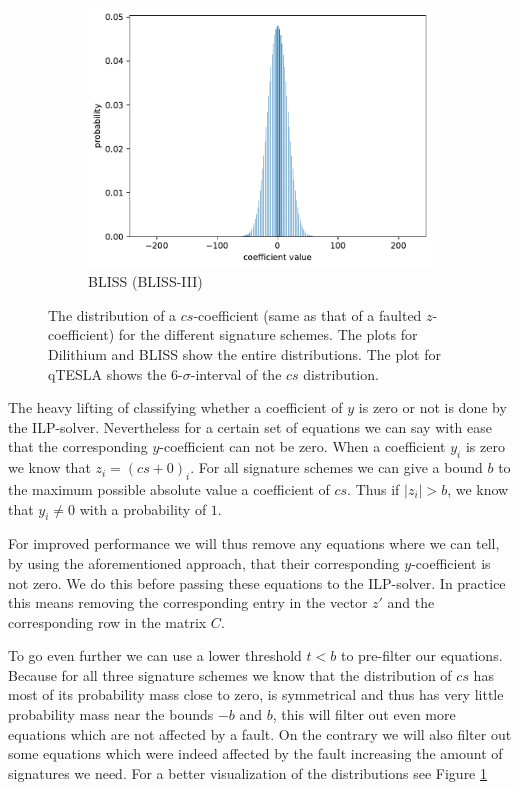 \begin{figure}
\begin{subfigure}{.5\textwidth}
		\includegraphics[width=.95\linewidth]{plots/bliss_l3_cs_plot}%
		\caption{BLISS (BLISS-III)}%
	\end{subfigure}%
%
	\caption{The distribution of a $cs$-coefficient (same as that of a faulted $z$-coefficient) for the different signature schemes. The plots for Dilithium and BLISS show the entire distributions. The plot for qTESLA shows the $6$-$σ$-interval of the $cs$ distribution.}
	\label{fig:csdist}
\end{figure}


The heavy lifting of classifying whether a coefficient of $y$ is zero or not is done by the ILP-solver.
Nevertheless for a certain set of equations we can say with ease that the corresponding $y$-coefficient can not be zero.
When a coefficient $y_{i}$ is zero we know that $z_{i} = (c s + 0)_{i}$. For all signature schemes we can give a bound $b$ to the maximum possible absolute value a coefficient of $cs$. Thus if $\lvert z_{i} \rvert>  b$, we know that $y_{i} \neq 0$ with a probability of $1$.

For improved performance we will thus remove any equations where we can tell, by using the aforementioned approach, that their corresponding $y$-coefficient is not zero. We do this before passing these equations to the ILP-solver. In practice this means removing the corresponding entry in the vector $z'$ and the corresponding row in the matrix $C$.

To go even further we can use a lower threshold $t < b$ to pre-filter our equations. Because for all three  signature schemes we know that the distribution of $cs$ has most of its probability mass close to zero, is symmetrical and thus has very little probability mass near the bounds $-b$ and $b$, this will filter out even more equations which are not affected by a fault. On the contrary we will also filter out some equations which were indeed affected by the fault increasing the amount of signatures we need. For a better visualization of the distributions see Figure \ref{fig:csdist}

